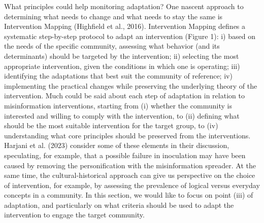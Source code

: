 \documentclass[authordate, empirical]{jote-new-article}
\begin{document}
	What principles could help monitoring adaptation? One nascent approach to determining what needs to change and what needs to stay the same is Intervention Mapping (Highfield et al., 2016). Intervention Mapping defines a systematic step-by-step protocol to adapt an intervention (Figure 1): i) based on the needs of the specific community, assessing what behavior (and its determinants) should be targeted by the intervention; ii) selecting the most appropriate intervention, given the conditions in which one is operating; iii) identifying the adaptations that best suit the community of reference; iv) implementing the practical changes while preserving the underlying theory of the intervention. Much could be said about each step of adaptation in relation to misinformation interventions, starting from (i) whether the community is interested and willing to comply with the intervention, to (ii) defining what should be the most suitable intervention for the target group, to (iv) understanding what core principles should be preserved from the interventions. Harjani et al. (2023) consider some of these elements in their discussion, speculating, for example, that a possible failure in inoculation may have been caused by removing the personification with the misinformation spreader. At the same time, the cultural-historical approach can give us perspective on the choice of intervention, for example, by assessing the prevalence of logical versus everyday concepts in a community. In this section, we would like to focus on point (iii) of adaptation, and particularly on what criteria should be used to adapt the intervention to engage the target community.
\end{document}
